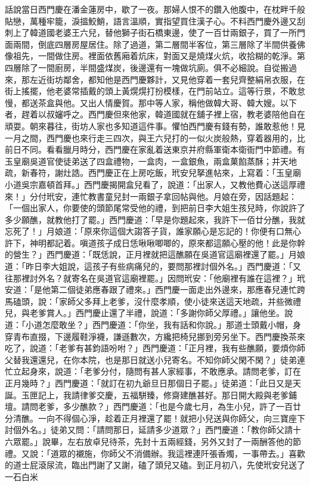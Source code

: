 \begin{showcontents}{}
話說當日西門慶在潘金蓮房中，歇了一夜。那婦人恨不的鑽入他腹中，在枕畔千般貼戀，萬種牢籠，淚搵鮫鮹，語言溫順，實指望買住漢子心。不料西門慶外邊又刮刺上了韓道國老婆王六兒，替他獅子街石橋東邊，使了一百廿兩銀子，買了一所門面兩間，倒底四層房屋居住。除了過道，第二層間半客位，第三層除了半間供養佛像祖先，一間做住房。裡面依舊廂着炕床，對面又是燒煤火炕，收拾糊的乾淨。第四層除了一間廚房，半間盛煤炭，後邊還有一塊做坑廁。俱不必細說。自從搬過來，那左近街坊鄰舍，都知他是西門慶夥計，又見他穿着一套兒齊整絹帛衣服，在街上搖擺，他老婆常插戴的頭上黃熀熀打扮模樣，在門前站立。這等行景，不敢怠慢，都送茶盒與他。又出人情慶賀。那中等人家，稱他做韓大哥、韓大嫂。以下者，趕着以叔嬸呼之。西門慶但來他家，韓道國就在舖子裡上宿，教老婆陪他自在頑耍。朝來暮往，街坊人家也多知道這件事。懼怕西門慶有錢有勢，誰敢惹他！見一月之間，西門慶也來行走三四次，與王六兒打的一似火炭般熱，穿着器用的，比前日不同。看看臘月時分，西門慶在家亂着送東京并府縣軍衛本衛衙門中節禮。有玉皇廟吳道官使徒弟送了四盒禮物，一盒肉，一盒銀魚，兩盒菓餡蒸酥；并天地疏，新春符，謝灶誥。西門慶正在上房吃飯，玳安兒拏進帖來，上寫着：「玉皇廟小道吳宗嘉頓首拜。」西門慶揭開盒兒看了，說道：「出家人，又教他費心送這厚禮來！」分付玳安，連忙教書童兒封一兩銀子拿回帖與他。月娘在旁，因話題起：「一個出家人，你要使的頭節尾常受他的禮，到把前日李大姐生孩兒時，你說許了多少願醮，就教他打了罷。」西門慶道：「早是你題起來，我許下一佰廿分醮，我就忘死了！」月娘道：「原來你這個大謅答子貨，誰家願心是忘記的！你便有口無心許下，神明都記着。嗔道孩子成日恁啾啾唧唧的，原來都這願心壓的他！此是你幹的營生？」西門慶道：「既恁說，正月裡就把這醮願在吳道官這廟裡還了罷。」月娘道：「昨日李大姐說，這孩子有些病痛兒的，要問那裡討個外名。」西門慶道：「又往那裡討外名？就寄名在吳道官這廟裡罷。」因問玳安：「他廟裡有誰在這裡？」玳安道：「是他第二個徒弟應春跟了禮來。」西門慶一面走出外邊來，那應春兒連忙跨馬磕頭，說：「家師父多拜上老爹，沒什麼孝順，使小徒來送這天地疏，并些微禮兒，與老爹賞人。」西門慶止還了半禮，說道：「多謝你師父厚禮。」讓他坐。說道：「小道怎麼敢坐？」西門慶道：「你坐，我有話和你說。」那道士頭戴小帽，身穿青布直掇，下邊履鞋淨襪，謙遜數次，方纔把椅兒挪到旁另坐下。西門慶換茶來吃了，說道：「老爹有甚鈞語吩咐？」西門慶道：「正月裡，我有些醮願，要煩你師父替我還還兒，在你本院，也是那日就送小兒寄名。不知你師父閑不閑？」徒弟連忙立起身來，說道：「老爹分付，隨問有甚人家經事，不敢應承。請問老爹，訂在正月幾時？」西門慶道：「就訂在初九爺旦日那個日子罷。」徒弟道：「此日又是天誕。玉匣記上，我請律爹交慶，五福駢臻，修齋建醮甚好。那日開大殿與老爹鋪壇。請問老爹，多少醮款？」西門慶道：「也是今歲七月，為生小兒，許了一百廿分清醮。一向不得個心淨，趁着正月裡還了罷！就把小兒送與你師父，向三寶座下討個外名。」徒弟又問：「請問那日，延請多少道眾？」西門慶道：「教你師父請十六眾罷。」說畢，左右放卓兒待茶，先封十五兩經錢，另外又封了一兩酬答他的節禮。又說：「道眾的襯施，你師父不消備辦。我這裡連阡張香燭，一事帶去。」喜歡的道士屁滾尿流，臨出門謝了又謝，磕了頭兒又磕。到正月初八，先使玳安兒送了一石白米
\end{showcontents}
